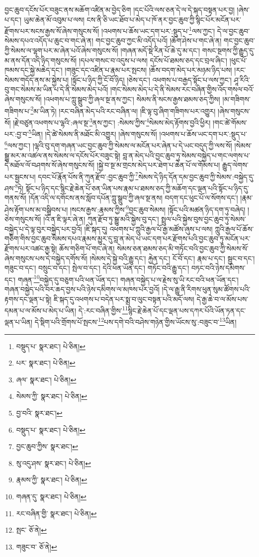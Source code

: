 བྱང་ཆུབ་དངོས་པོར་བཟུང་ནས་མཆོག་འཛིན་མ་བྱེད་ཅིག །དང་པོའི་ལས་ཅན་དེ་ལ་དེ་སྐད་བསྟན་པར་བྱ། །ཞེས་པ་དང་། ཡུམ་ཆེན་མོ་འབུམ་པ་ལས། ངས་ནི་ཅི་ཡང་ཐོབ་པ་མེད་པ་ཁོ་ནར་བྱང་ཆུབ་ཀྱི་སྙིང་པོར་མངོན་པར་རྫོགས་པར་སངས་རྒྱས་སོ་ཞེས་གསུངས་སོ། །འཕགས་པ་ཆོས་ཡང་དག་པར་:སྡུད་པ་\footnote{བསྡུད་པ་  སྣར་ཐང་།  པེ་ཅིན། }ལས་ཀྱང་། དེ་ལ་བྱང་ཆུབ་སེམས་དཔའ་འདོད་པ་ཆུང་བ་གང་ཞེ་ན། གང་བྱང་ཆུབ་ཀྱང་མི་འདོད་པའོ། །ཆོག་ཤེས་པ་གང་ཞེ་ན། གང་བྱང་ཆུབ་ཀྱི་སེམས་ལ་ལྷག་པར་མ་ཞེན་པའོ་ཞེས་གསུངས་སོ། །གཞན་མདོ་སྡེ་རིན་པོ་ཆེ་དུ་མ་དང་། གསང་སྔགས་ཀྱི་རྒྱུད་དུ་མ་ནས་དོན་འདི་ཉིད་གསུངས་སོ། །དཔལ་གསང་བ་འདུས་པ་ལས། དངོས་པོ་ཐམས་ཅད་དང་བྲལ་ཞིང་། །ཕུང་པོ་ཁམས་དང་སྐྱེ་མཆེད་དང་། །གཟུང་དང་འཛིན་པ་རྣམ་པར་སྤངས། །ཆོས་བདག་མེད་པར་མཉམ་ཉིད་པས། །རང་སེམས་གདོད་ནས་མ་སྐྱེས་པ། །སྟོང་པ་ཉིད་ཀྱི་ངོ་བོ་ཉིད། །ཅེས་དང་། འཕགས་པ་བརྒྱད་སྟོང་པ་ལས་ཀྱང་། ཤཱ་རིའི་བུ་གང་སེམས་མ་ཡིན་པ་དེ་ནི་སེམས་མེད་པའོ། །གང་སེམས་མེད་པ་དེ་ནི་སེམས་རང་བཞིན་གྱིས་འོད་གསལ་བའོ་ཞེས་གསུངས་སོ། །འཕགས་པ་ཀླུ་སྒྲུབ་ཀྱི་ཞལ་སྔ་ནས་ཀྱང་། སེམས་ནི་སངས་རྒྱས་ཐམས་ཅད་ཀྱིས། །མ་གཟིགས་གཟིགས་པ་\footnote{པར་  སྣར་ཐང་།  པེ་ཅིན། }མ་ཡིན་ཏེ། །རང་བཞིན་མེད་པའི་རང་བཞིན་ལ། །ཇི་ལྟ་བུ་ཞིག་གཟིགས་པར་འགྱུར། །ཞེས་གསུངས་སོ། །རྗེ་བཙུན་འཕགས་པ་ལྷའི་:ཞལ་སྔ་\footnote{ཞལ་  སྣར་ཐང་།  པེ་ཅིན། }ནས་ཀྱང་། :སེམས་ཀྱིས་\footnote{སེམས་ཀྱི་  སྣར་ཐང་།  པེ་ཅིན། }སེམས་མེད་རྟོགས་བྱའི་ཕྱིར། །གང་ཚེ་གོམས་པར་:བྱ་བ་\footnote{བྱ་བའི་  སྣར་ཐང་། }ཡིན། །དེ་ཚེ་སེམས་ནི་མཐོང་མི་འགྱུར། །ཞེས་གསུངས་སོ། །འཕགས་པ་ཆོས་ཡང་དག་པར་:སྡུད་པ་\footnote{བསྡུད་པ་  སྣར་ཐང་།  པེ་ཅིན། }ལས་ཀྱང་། །ལྷའི་བུ་དག་གཞན་ཡང་བྱང་ཆུབ་ཀྱི་སེམས་ལ་མངོན་པར་ཞེན་པ་དེ་ཡང་བདུད་ཀྱི་ལས་སོ། །སེམས་སྒྱུ་མར་མ་འཚལ་ནས་སེམས་ལ་དངོས་པོར་བཟུང་སྟེ། བླ་ན་མེད་པའི་བྱང་ཆུབ་ཏུ་སེམས་བསྐྱེད་པ་གང་ལགས་པ་དེ་མཐོལ་ལོ་བཤགས་སོ་ཞེས་གསུངས་སོ། །སྐྱེ་བ་སྔ་མ་གྲངས་མེད་པར་ཐེག་པ་ཆེན་པོ་ལ་གོམས་པ། རྒྱུད་ལེགས་པར་སྦྱངས་པ། དབང་པོ་རྣོན་པོས་ནི་ཀུན་རྫོབ་:བྱང་ཆུབ་ཀྱི་\footnote{བྱང་ཆུབ་ཀྱིས་  སྣར་ཐང་། }སེམས་དེ་ཉིད་དོན་དམ་བྱང་ཆུབ་ཀྱི་སེམས་:བསྐྱེད་དུ་ཤས་\footnote{སུ་འདུ་ཤས་  སྣར་ཐང་།  པེ་ཅིན། }ཏེ། སྟོང་པ་ཉིད་དང་སྙིང་རྗེ་ཆེན་པོ་ཅན་ཡིན་པས་རྣམ་པ་ཐམས་ཅད་ཀྱི་མཆོག་དང་ལྡན་པའི་སྟོང་པ་ཉིད་དུ་གནས་སོ། །དོན་འདི་ལ་དགོངས་ནས་སློབ་དཔོན་ཀླུ་སྒྲུབ་ཀྱི་ཞལ་སྔ་ནས། བདག་དང་ཕུང་པོ་ལ་སོགས་དང་། །རྣམ་ཤེས་རྟོག་པས་མ་བསྒྲིབས་པ། །སངས་རྒྱས་:རྣམས་ཀྱིས་\footnote{རྣམས་ཀྱི་  སྣར་ཐང་།  པེ་ཅིན། }བྱང་ཆུབ་སེམས། །སྟོང་པའི་མཚན་ཉིད་དག་ཏུ་བཞེད། །ཅེས་གསུངས་སོ། །འོ་ན་ཇི་ལྟར་ཞེ་ན། ཀུན་རྫོབ་ཏུ་སྒྱུ་མའི་སྐྱེས་བུ་དང་། སྤྲུལ་པའི་སྐྱེས་བུས་བྱང་ཆུབ་ཏུ་སེམས་བསྐྱེད་པ་དེ་ལྟ་བུར་བསྐྱེད་པར་བྱའོ། །ཇི་སྐད་དུ། འཕགས་པ་ཀླུའི་རྒྱལ་པོ་རྒྱ་མཚོས་ཞུས་པ་ལས། ཀླུའི་རྒྱལ་པོ་ཆོས་གཅིག་གིས་བྱང་ཆུབ་སེམས་དཔའ་རྣམས་མྱུར་དུ་བླ་ན་མེད་པ་ཡང་དག་པར་རྫོགས་པའི་བྱང་ཆུབ་ཏུ་མངོན་པར་རྫོགས་པར་འཚང་རྒྱ་སྟེ། ཆོས་གཅིག་པོ་གང་ཞེ་ན། སེམས་ཅན་ཐམས་ཅད་མི་གཏོང་བའི་བྱང་ཆུབ་ཀྱི་སེམས་སོ་ཞེས་གསུངས་པས་དེ་བསྐྱེད་དགོས་སོ། །སེམས་དེ་སྐྱེ་བའི་རྒྱུ་དང་། རྐྱེན་དང་། ངོ་བོ་དང་། རྣམ་པ་དང་། སྦྱང་བ་དང་། གཟུང་བ་དང་། བསྲུང་བ་དང་། སྤེལ་བ་དང་། དེའི་ཕན་ཡོན་དང་། གཏོང་བའི་རྒྱུ་དང་། བཏང་བའི་ཉེས་དམིགས་དང་། གཞན་\footnote{གཞན་དུ་  སྣར་ཐང་།  པེ་ཅིན། }བསྐྱེད་དུ་བཅུག་པའི་ཕན་ཡོན་དང་། གཞན་བསྐྱེད་པ་ལ་རྗེས་སུ་ཡི་རང་བའི་ཕན་ཡོན་དང་། གཞན་བསྐྱེད་པའི་བར་ཆད་བྱས་པའི་ཉེས་དམིགས་ལ་མཁས་པར་བྱའོ། །དེ་ལ་རྒྱུ་ནི་རིགས་ཕུན་སུམ་ཚོགས་པའི་རྟགས་དང་ལྡན་པ་སྟེ། ཇི་སྐད་དུ་འཕགས་པ་བདེན་པར་སྨྲ་བ་ལུང་བསྟན་པའི་མདོ་ལས། དེ་རྒྱ་ཆེ་བ་ལ་མོས་པས་དམན་པ་ལ་མོས་པ་མེད་པ་ཡིན། དེ་:རང་བཞིན་གྱིས་\footnote{རང་བཞིན་གྱི་  སྣར་ཐང་།  པེ་ཅིན། }སྙིང་རྗེ་ཆེན་པོ་དང་ལྡན་པས་དཀར་པོའི་ཡོན་ཏན་དང་ལྡན་པ་ཡིན། དེ་སྡིག་པའི་གྲོགས་པོ་སྤངས་\footnote{སྤང་  ཅོ་ནེ། }པས་དགེ་བའི་བཤེས་གཉེན་གྱིས་ཡོངས་སུ་:བཟུང་བ་\footnote{གཟུང་བ་  ཅོ་ནེ། }ཡིན། 